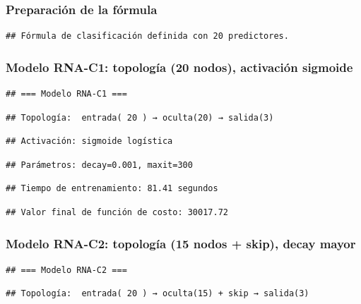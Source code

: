 \documentclass[
]{article}
\begin{document}
\subsubsection{Preparación de la
fórmula}\label{preparaciuxf3n-de-la-fuxf3rmula}

\begin{verbatim}
## Fórmula de clasificación definida con 20 predictores.
\end{verbatim}

\subsubsection{Modelo RNA-C1: topología (20 nodos), activación
sigmoide}\label{modelo-rna-c1-topologuxeda-20-nodos-activaciuxf3n-sigmoide}

\begin{verbatim}
## === Modelo RNA-C1 ===
\end{verbatim}

\begin{verbatim}
## Topología:  entrada( 20 ) → oculta(20) → salida(3)
\end{verbatim}

\begin{verbatim}
## Activación: sigmoide logística
\end{verbatim}

\begin{verbatim}
## Parámetros: decay=0.001, maxit=300
\end{verbatim}

\begin{verbatim}
## Tiempo de entrenamiento: 81.41 segundos
\end{verbatim}

\begin{verbatim}
## Valor final de función de costo: 30017.72
\end{verbatim}

\subsubsection{Modelo RNA-C2: topología (15 nodos + skip), decay
mayor}\label{modelo-rna-c2-topologuxeda-15-nodos-skip-decay-mayor}

\begin{verbatim}
## === Modelo RNA-C2 ===
\end{verbatim}

\begin{verbatim}
## Topología:  entrada( 20 ) → oculta(15) + skip → salida(3)
\end{verbatim}
\end{document}
